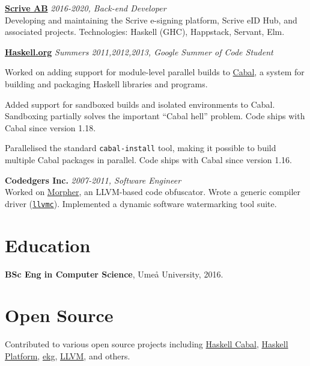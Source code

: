 \documentclass[margin,line]{res}
\begin{document}
\begin{resume}
      {\bf \href{https://scrive.com}{Scrive AB}} \hfill {\it 2016-2020, Back-end Developer}\\
      Developing and maintaining the Scrive e-signing platform, Scrive eID Hub,
      and associated projects. Technologies: Haskell (GHC), Happstack, Servant,
      Elm.

            {\bf \href{https://haskell.org}{Haskell.org}} \hfill {\it Summers 2011,2012,2013, Google Summer of Code Student}\\
      \begin{list}{}{\leftmargin=1.5em}
            \item Worked on adding support for module-level parallel builds to
                  \href{https://haskell.org/cabal}{Cabal}, a system for building and
                  packaging Haskell libraries and programs.

            \item Added support for sandboxed builds and isolated environments to
                  Cabal. Sandboxing partially solves the important ``Cabal hell'' problem. Code
                  ships with Cabal since version 1.18.

            \item Parallelised the standard \texttt{cabal-install} tool, making it possible to
                  build multiple Cabal packages in parallel. Code ships with Cabal since version
                  1.16.
      \end{list}

      {\bf Codedgers Inc.} \hfill {\it 2007-2011, Software Engineer}\\
      Worked on \href{https://archive.is/ZAI8z}{Morpher}, an LLVM-based code
      obfuscator. Wrote a generic compiler driver
      (\href{https://llvm.org/releases/2.9/docs/CompilerDriver.html}{\texttt{llvmc}}). Implemented
      a dynamic software watermarking tool suite.

      \section{\sc Education}
       {\bf BSc Eng in Computer Science}, Umeå University, 2016.

      \section{\sc Open Source}

      Contributed to various open source projects including
      \href{https://github.com/haskell/cabal/}{Haskell Cabal}, \href{https://www.haskell.org/platform/}{Haskell Platform},
      \href{https://hackage.haskell.org/package/ekg}{ekg}, \href{https://llvm.org/}{LLVM}, and others.


\end{resume}
\end{document}
